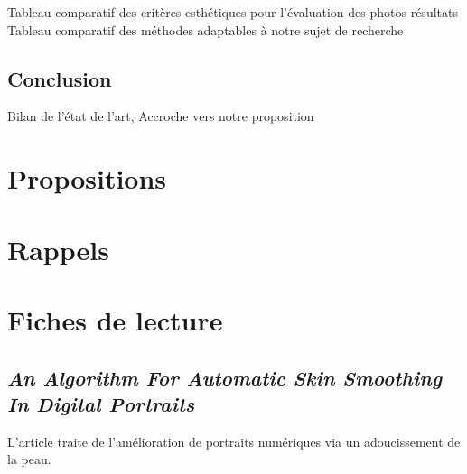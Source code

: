 \documentclass[11pt, french]{report-rd-info}
\begin{document}
Tableau comparatif des critères esthétiques pour l’évaluation des photos résultats
Tableau comparatif des méthodes adaptables à notre sujet de recherche

\section{Conclusion}
Bilan de l’état de l’art, Accroche vers notre proposition





\chapter{Propositions}
\label{chap:Propositions}





\listoffigures{}

\listoftables{}

\listofalgorithms{}

\appendix

\chapter{Rappels}
\label{ann:Rappels}

\chapter{Fiches de lecture}
\label{ann:FichesLecture}

\section{\emph{An Algorithm For Automatic Skin Smoothing In Digital Portraits}}
L'article \cite{Lee} traite de l'amélioration de portraits numériques via un adoucissement de la peau.
\end{document}
